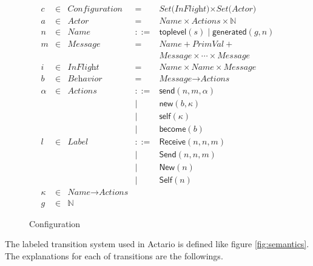 \begin{figure}[t]
  \begin{displaymath}
    \begin{array}{rclcl}
      c & \in & \textit{Configuration} & =   & \textit{Set(InFlight)} \times \textit{Set(Actor)} \\
      a & \in & \textit{Actor}  & =   & \textit{Name} \times \textit{Actions} \times \mathbb{N} \\
      n & \in & \textit{Name}   & ::= & \textsf{toplevel}(s) \mid \textsf{generated}(g, n) \\
      m & \in & \textit{Message} & =  & \textit{Name} + \textit{PrimVal} + \\
        &     &                 &     & \textit{Message} \times \cdots \times \textit{Message} \\
      i & \in & \textit{InFlight} & = & \textit{Name} \times \textit{Name} \times \textit{Message} \\
      b & \in & \textit{Behavior} & = & \textit{Message} \rightarrow \textit{Actions} \\
      \alpha & \in & \textit{Actions} & ::= & \textsf{send}(n, m, \alpha) \\
        &     &                 &   | & \textsf{new}(b, \kappa) \\
        &     &                 &   | & \textsf{self}(\kappa) \\
        &     &                 &   | & \textsf{become}(b) \\
      l & \in & \textit{Label}  & ::= & \textsf{Receive}(n, n, m) \\
        &     &                 &   | & \textsf{Send}(n, n, m) \\
        &     &                 &   | & \textsf{New}(n) \\
        &     &                 &   | & \textsf{Self}(n) \\
      \kappa & \in & \textit{Name} \rightarrow \textit{Actions} & & \\
      g & \in & \mathbb{N} & &
    \end{array}
  \end{displaymath}
  \caption{Configuration}\label{fig:config}
\end{figure}

The labeled transition system used in Actario is defined like figure \ref{fig:semantics}.
The explanations for each of transitions are the followings.

